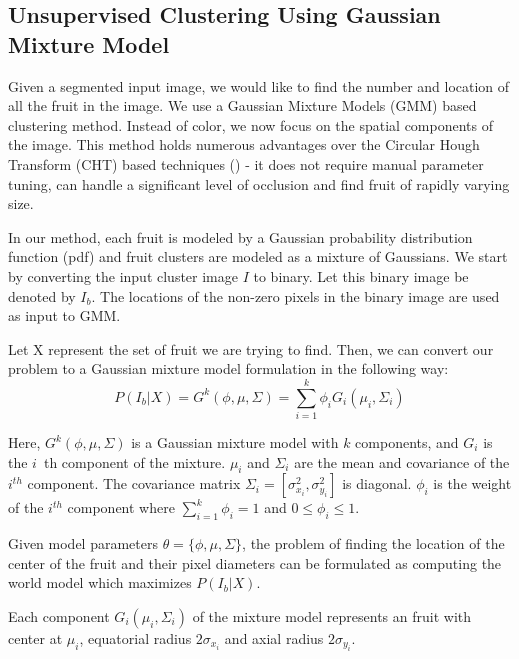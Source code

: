 \subsection{Unsupervised Clustering Using Gaussian Mixture Model} \label{subsec:gmmcount}
Given a segmented input image, we would like to find the number and location of all the fruit in the image. We use a Gaussian Mixture Models (GMM) based clustering method. Instead of color, we now focus on the spatial components of the image. This method holds numerous advantages over the Circular Hough Transform (CHT) based techniques (\cite{cht}) - it does not require manual parameter tuning, can handle a significant level of occlusion and find fruit of rapidly varying size.

In our method, each fruit is modeled by a Gaussian probability distribution function (pdf) and fruit clusters are modeled as a mixture of Gaussians. We start by converting the input cluster image $I$ to binary. Let this binary image be denoted by $I_{b}$. The locations of the non-zero pixels in the binary image are used as input to GMM. 

\noindent Let X represent the set of fruit we are trying to find. Then, we can convert our problem to a Gaussian mixture model formulation in the following way:
\begin{equation}
P(I_b|X) = G^k(\phi,\mu,\Sigma) = \sum_{i = 1}^k \phi_{i} G_{i}(\mu_{i},\Sigma_{i})
\end{equation}

Here, $G^k(\phi,\mu,\Sigma)$ is a Gaussian mixture model with  $k$ components, and $G_{i}$ is the $i$~th component of the mixture. $\mu_{i}$ and $\Sigma_{i}$ are the mean and covariance of the $i^{th}$ component. The covariance matrix $\Sigma_{i} = \left[\sigma_{x_{i}}^2,\sigma_{y_{i}}^2\right]$ is diagonal. $\phi_{i}$ is the weight of the $i^{th}$ component where $\sum_{i= 1}^k \phi_{i} = 1$ and $0\leq \phi_{i}\leq 1$. 

Given model parameters $\theta = \{ \phi, \mu, \Sigma \}$, 
the problem of finding the location of the center of the fruit and their pixel diameters can be formulated as computing the world model which maximizes $P(I_b|X)$.

Each component $G_{i}(\mu_{i},\Sigma_{i})$ of the mixture model represents an fruit with center at $\mu_{i}$, equatorial radius $2\sigma_{x_{i}}$ and axial radius $2\sigma_{y_{i}}$. 


